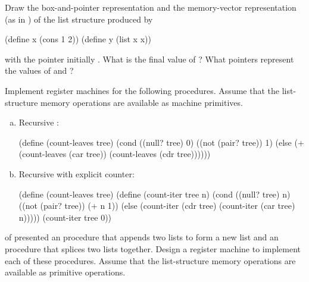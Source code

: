 \begin{exerciseGroup}
\label{Exercise 5.20}
 Draw the box-and-pointer
representation and the memory-vector representation (as in )
of the list structure produced by

\begin{codeBlock}
(define x (cons 1 2))
(define y (list x x))
\end{codeBlock}

\noindent
with the  pointer initially .  What is the final value of
 ?  What pointers represent the values of  and  ?

\label{Exercise 5.21}
 Implement register machines for
the following procedures.  Assume that the list-structure memory operations are
available as machine primitives.

\begin{enumerate}[a.]

\item
Recursive :

\begin{codeBlock}
(define (count-leaves tree)
  (cond ((null? tree) 0)
        ((not (pair? tree)) 1)
        (else (+ (count-leaves (car tree))
                 (count-leaves (cdr tree))))))
\end{codeBlock}

\item
Recursive  with explicit counter:

\begin{codeBlock}
(define (count-leaves tree)
  (define (count-iter tree n)
    (cond ((null? tree) n)
          ((not (pair? tree)) (+ n 1))
          (else
           (count-iter (cdr tree)
                       (count-iter (car tree)
                                   n)))))
  (count-iter tree 0))
\end{codeBlock}
\end{enumerate}

\label{Exercise 5.22}
  of
 presented an  procedure that appends two lists to form
a new list and an  procedure that splices two lists together.
Design a register machine to implement each of these procedures.  Assume that
the list-structure memory operations are available as primitive operations.
\end{exerciseGroup}

